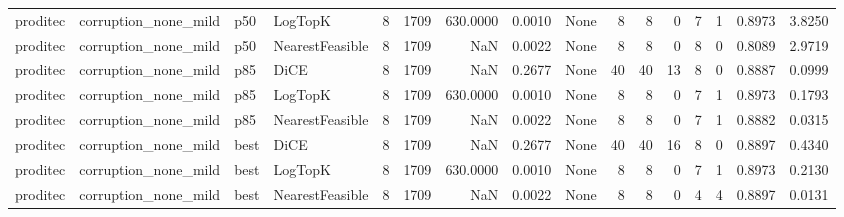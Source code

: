 \begin{tabular}{llllrrrrlrrrrrrr}
proditec & corruption\_none\_mild &    p50 &         LogTopK &            8 &                 1709 &                 630.0000 &      0.0010 &                                               None &      8 &            8 &        0 &              7 &          1 &             0.8973 &         3.8250 \\
proditec & corruption\_none\_mild &    p50 & NearestFeasible &            8 &                 1709 &                      NaN &      0.0022 &                                               None &      8 &            8 &        0 &              8 &          0 &             0.8089 &         2.9719 \\
proditec & corruption\_none\_mild &    p85 &            DiCE &            8 &                 1709 &                      NaN &      0.2677 &                                               None &     40 &           40 &       13 &              8 &          0 &             0.8887 &         0.0999 \\
proditec & corruption\_none\_mild &    p85 &         LogTopK &            8 &                 1709 &                 630.0000 &      0.0010 &                                               None &      8 &            8 &        0 &              7 &          1 &             0.8973 &         0.1793 \\
proditec & corruption\_none\_mild &    p85 & NearestFeasible &            8 &                 1709 &                      NaN &      0.0022 &                                               None &      8 &            8 &        0 &              7 &          1 &             0.8882 &         0.0315 \\
proditec & corruption\_none\_mild &   best &            DiCE &            8 &                 1709 &                      NaN &      0.2677 &                                               None &     40 &           40 &       16 &              8 &          0 &             0.8897 &         0.4340 \\
proditec & corruption\_none\_mild &   best &         LogTopK &            8 &                 1709 &                 630.0000 &      0.0010 &                                               None &      8 &            8 &        0 &              7 &          1 &             0.8973 &         0.2130 \\
proditec & corruption\_none\_mild &   best & NearestFeasible &            8 &                 1709 &                      NaN &      0.0022 &                                               None &      8 &            8 &        0 &              4 &          4 &             0.8897 &         0.0131 \\

\end{tabular}
